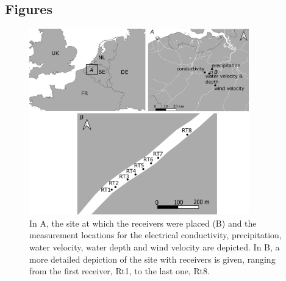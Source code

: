 \documentclass[doublespacing,linenumbers]{bmcart}
\begin{document}
\begin{backmatter}




\section*{Figures}

\begin{figure}[h!]
  \includegraphics[width=0.85\textwidth]{study_area}
  \caption{ In A, the site at which the receivers were placed (B) and the measurement locations for the electrical conductivity, precipitation, water velocity, water depth and wind velocity are depicted. In B, a more detailed depiction of the site with receivers is given, ranging from the first receiver, Rt1, to the last one, Rt8.}
  \label{fig:study_area}
\end{figure}


\end{backmatter}
\end{document}
